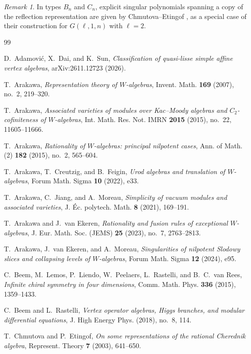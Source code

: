 \documentclass[11pt,reqno]{amsart}
\theoremstyle{remark}
\newtheorem{remark}[theorem]{Remark}
\begin{document}
\begin{remark}
In types $B_n$ and $C_n$, explicit singular polynomials spanning
a copy of the reflection representation are given by
Chmutova--Etingof \cite[Proposition~4.1]{CE}, as a special case
of their construction for $G(\ell,1,n)$ with $\ell=2$.
\end{remark}


\begin{thebibliography}{99}

D.~Adamovi\'c, X.~Dai, and K.~Sun,
\emph{Classification of quasi-lisse simple affine vertex algebras},
arXiv:2611.12723 (2026).

T.~Arakawa,
\emph{Representation theory of $W$-algebras},
Invent. Math. \textbf{169} (2007), no.~2, 219--320.

T.~Arakawa,
\emph{Associated varieties of modules over Kac--Moody algebras and
$C_2$-cofiniteness of $W$-algebras},
Int. Math. Res. Not. IMRN \textbf{2015} (2015), no.~22,
11605--11666.

T.~Arakawa,
\emph{Rationality of $W$-algebras: principal nilpotent cases},
Ann. of Math. (2) \textbf{182} (2015), no.~2, 565--604.

T.~Arakawa, T.~Creutzig, and B.~Feigin,
\emph{Urod algebras and translation of $W$-algebras},
Forum Math. Sigma \textbf{10} (2022), e33.

T.~Arakawa, C.~Jiang, and A.~Moreau,
\emph{Simplicity of vacuum modules and associated varieties},
J. \'Ec. polytech. Math. \textbf{8} (2021), 169--191.


T.~Arakawa and J.~van Ekeren,
\emph{Rationality and fusion rules of exceptional $W$-algebras},
J. Eur. Math. Soc. (JEMS) \textbf{25} (2023), no.~7, 2763--2813.

 T.~Arakawa, J.~van Ekeren, and A.~Moreau, \emph{Singularities of nilpotent Slodowy slices and collapsing levels of $W$-algebras}, Forum Math. Sigma \textbf{12} (2024), e95.

C.~Beem, M.~Lemos, P.~Liendo, W.~Peelaers, L.~Rastelli, and
B.~C.~van Rees,
\emph{Infinite chiral symmetry in four dimensions},
Comm. Math. Phys. \textbf{336} (2015), 1359--1433.

C.~Beem and L.~Rastelli,
\emph{Vertex operator algebras, Higgs branches, and modular
differential equations},
J. High Energy Phys. (2018), no.~8, 114.

T.~Chmutova and P.~Etingof,
\emph{On some representations of the rational Cherednik algebra},
Represent. Theory \textbf{7} (2003), 641--650.


\end{thebibliography}
\end{document}
